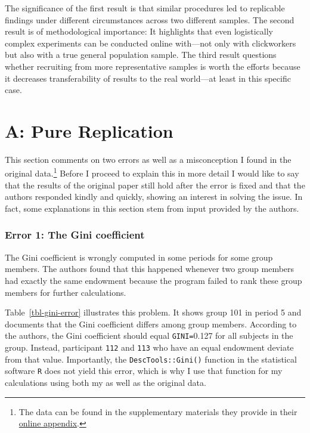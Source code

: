 \documentclass[
  authoryear,
  preprint,
  3p]{elsarticle}
\begin{document}
The significance of the first result is that similar procedures led to
replicable findings under different circumstances across two different
samples. The second result is of methodological importance: It
highlights that even logistically complex experiments can be conducted
online with---not only with clickworkers but also with a true general
population sample. The third result questions whether recruiting from
more representative samples is worth the efforts because it decreases
transferability of results to the real world---at least in this specific
case.

\newpage{}

\hypertarget{a-pure-replication}{%
\section{A: Pure Replication}\label{a-pure-replication}}

This section comments on two errors as well as a misconception I found
in the original data.\footnote{The data can be found in the
  supplementary materials they provide in their
  \href{https://www.sciencedirect.com/science/article/pii/S0047272717300361\#s0115}{online
  appendix}.} Before I proceed to explain this in more detail I would
like to say that the results of the original paper still hold after the
error is fixed and that the authors responded kindly and quickly,
showing an interest in solving the issue. In fact, some explanations in
this section stem from input provided by the authors.

\hypertarget{error-1-the-gini-coefficient}{%
\subsubsection{Error 1: The Gini
coefficient}\label{error-1-the-gini-coefficient}}

The Gini coefficient is wrongly computed in some periods for some group
members. The authors found that this happened whenever two group members
had exactly the same endowment because the program failed to rank these
group members for further calculations.

Table~\ref{tbl-gini-error} illustrates this problem. It shows group 101
in period 5 and documents that the Gini coefficient differs among group
members. According to the authors, the Gini coefficient should equal
\texttt{GINI=}0.127 for all subjects in the group. Instead, participant
\texttt{112} and \texttt{113} who have an equal endowment deviate from
that value. Importantly, the \texttt{DescTools::Gini()} function in the
statistical software \texttt{R} does not yield this error, which is why
I use that function for my calculations using both my as well as the
original data.
\end{document}
